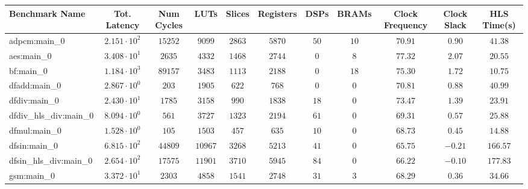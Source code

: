 \begin{tabular}{|l|c|c|c|c|c|c|c|c|c|c|}
\hline
Benchmark Name          & Tot. Latency           & Num Cycles & LUTs      & Slices    & Registers & DSPs    & BRAMs   & Clock Frequency & Clock Slack & HLS Time(s) \\
\hline
adpcm:main\_0           & $ 2.151 \cdot 10^{2} $ & $ 15252  $ & $ 9099  $ & $ 2863  $ & $ 5870  $ & $ 50  $ & $ 10  $ & $ 70.91       $ & $ 0.90    $ & $ 41.38   $ \\
aes:main\_0             & $ 3.408 \cdot 10^{1} $ & $ 2635   $ & $ 4332  $ & $ 1468  $ & $ 2744  $ & $ 0   $ & $ 8   $ & $ 77.32       $ & $ 2.07    $ & $ 20.55   $ \\
bf:main\_0              & $ 1.184 \cdot 10^{3} $ & $ 89157  $ & $ 3483  $ & $ 1113  $ & $ 2188  $ & $ 0   $ & $ 18  $ & $ 75.30       $ & $ 1.72    $ & $ 10.75   $ \\
dfadd:main\_0           & $ 2.867 \cdot 10^{0} $ & $ 203    $ & $ 1905  $ & $ 622   $ & $ 768   $ & $ 0   $ & $ 0   $ & $ 70.81       $ & $ 0.88    $ & $ 40.99   $ \\
dfdiv:main\_0           & $ 2.430 \cdot 10^{1} $ & $ 1785   $ & $ 3158  $ & $ 990   $ & $ 1838  $ & $ 18  $ & $ 0   $ & $ 73.47       $ & $ 1.39    $ & $ 23.91   $ \\
dfdiv\_hls\_div:main\_0 & $ 8.094 \cdot 10^{0} $ & $ 561    $ & $ 3727  $ & $ 1323  $ & $ 2194  $ & $ 61  $ & $ 0   $ & $ 69.31       $ & $ 0.57    $ & $ 25.88   $ \\
dfmul:main\_0           & $ 1.528 \cdot 10^{0} $ & $ 105    $ & $ 1503  $ & $ 457   $ & $ 635   $ & $ 10  $ & $ 0   $ & $ 68.73       $ & $ 0.45    $ & $ 14.88   $ \\
dfsin:main\_0           & $ 6.815 \cdot 10^{2} $ & $ 44809  $ & $ 10967 $ & $ 3268  $ & $ 5213  $ & $ 41  $ & $ 0   $ & $ 65.75       $ & $ -0.21   $ & $ 166.57  $ \\
dfsin\_hls\_div:main\_0 & $ 2.654 \cdot 10^{2} $ & $ 17575  $ & $ 11901 $ & $ 3710  $ & $ 5945  $ & $ 84  $ & $ 0   $ & $ 66.22       $ & $ -0.10   $ & $ 177.83  $ \\
gsm:main\_0             & $ 3.372 \cdot 10^{1} $ & $ 2303   $ & $ 4858  $ & $ 1541  $ & $ 2748  $ & $ 31  $ & $ 3   $ & $ 68.29       $ & $ 0.36    $ & $ 34.66   $ \\

\end{tabular}
